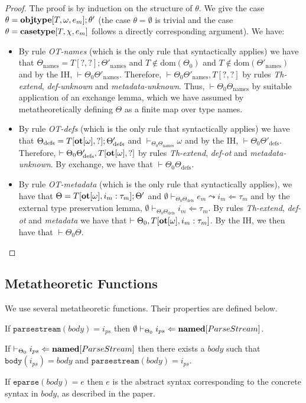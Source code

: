 \begin{proof}
The proof is by induction on the structure of $\theta$. We give the case $\theta = \textbf{objtype}[T, \omega, e_m]; \theta'$ (the case $\theta=\emptyset$ is trivial and the case $\theta=\textbf{casetype}[T, \chi, e_m]$ follows a directly corresponding argument). We have:
\begin{itemize}
\item By rule \textit{OT-names} (which is the only rule that syntactically applies) we have that $\Theta_{\text{names}}=T[?,?];\Theta'_{\text{names}}$ and $T \notin \text{dom}(\Theta_0)$ and $T \notin \text{dom}(\Theta'_{\text{names}})$ and by the IH, $\vdash \Theta_0 \Theta'_{\text{names}}$. Therefore, $\vdash \Theta_0 \Theta'_{\text{names}}, T[?,?]$ by rules \textit{Th-extend}, \textit{def-unknown} and \textit{metadata-unknown}. Thus, $\vdash \Theta_0 \Theta_{\text{names}}$ by suitable application of an exchange lemma, which we have assumed by metatheoretically defining $\Theta$  as a finite map over type names.
\item By rule \textit{OT-defs} (which is the only rule that syntactically applies) we have that $\Theta_{\text{defs}}=T[\textbf{ot}[\omega],?];\Theta'_{\text{defs}}$ and $\vdash_{\Theta_0\Theta_{\text{names}}} \omega$ and by the IH, $\vdash \Theta_0 \Theta'_{\text{defs}}$. Therefore, $\vdash \Theta_0 \Theta'_{\text{defs}}, T[\textbf{ot}[\omega], ?]$ by rules \textit{Th-extend}, \textit{def-ot} and \textit{metadata-unknown}. By exchange, we have that $\vdash \Theta_0 \Theta_{\text{defs}}$. 
\item By rule \textit{OT-metadata} (which is the only rule that syntactically applies), we have that $\Theta = T[\textbf{ot}[\omega], i_m : \tau_m]; \Theta'$ and $\emptyset \vdash_{\Theta_0 \Theta_{\text{defs}}} e_m \leadsto i_m \Leftarrow \tau_m$ and by the external type preservation lemma, $\emptyset \vdash_{\Theta_0 \Theta_{\text{defs}}} i_m \Leftarrow \tau_m$. By rules \textit{Th-extend}, \textit{def-ot} and \textit{metadata}  we have that $\vdash \Theta_0, T[\textbf{ot}[\omega], i_m : \tau_m]$. By the IH, we then have that $\vdash \Theta_0 \Theta$.
\end{itemize}
\end{proof}
\subsection{Metatheoretic Functions}
We use several metatheoretic functions. Their properties are defined below.
\begin{definition}
If $\mathtt{parsestream}(\mathit{body})=i_{ps}$ then $\emptyset \vdash_{\Theta_0} i_{ps} \Leftarrow \textbf{named}[ParseStream]$.
\end{definition}
\begin{definition}
If $\vdash_{\Theta_0} i_{ps} \Leftarrow \textbf{named}[ParseStream]$ then there exists a $\mathit{body}$ such that $\mathtt{body}(i_{ps})=\mathit{body}$ and $\mathtt{parsestream}(\mathit{body})=i_{ps}$.
\end{definition}
\begin{definition}
If $\mathtt{eparse}(\mathit{body})=e$ then $e$ is the abstract syntax corresponding to the concrete syntax in $\mathit{body}$, as described in the paper.
\end{definition}

